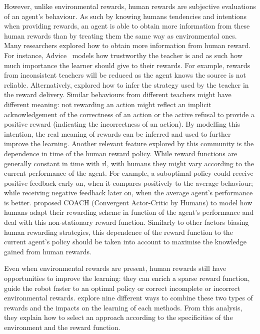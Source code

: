 However, unlike environmental rewards, human rewards are subjective evaluations of an agent's behaviour. As such by knowing humans tendencies and intentions when providing rewards, an agent is able to obtain more information from these human rewards than by treating them the same way as environmental ones. Many researchers explored how to obtain more information from human reward. For instance, Advice~\citep{griffith2013policy} models how trustworthy the teacher is and as such how much importance the learner should give to their rewards. For example, rewards from inconsistent teachers will be reduced as the agent knows the source is not reliable. Alternatively, \cite{loftin2016learning} explored how to infer the strategy used by the teacher in the reward delivery. Similar behaviours from different teachers might have different meaning: not rewarding an action might reflect an implicit acknowledgement of the correctness of an action or the active refusal to provide a positive reward (indicating the incorrectness of an action). By modelling this intention, the real meaning of rewards can be inferred and used to further improve the learning. Another relevant feature explored by this community is the dependence in time of the human reward policy. While reward functions are generally constant in time with \gls{rl}, with humans they might vary according to the current performance of the agent. For example, a suboptimal policy could receive positive feedback early on, when it compares positively to the average behaviour; while receiving negative feedback later on, when the average agent's performance is better. \cite{macglashan2017interactive} proposed COACH (Convergent Actor-Critic by Humans) to model how humans adapt their rewarding scheme in function of the agent's performance and deal with this non-stationary reward function. Similarly to other factors biasing human rewarding strategies, this dependence of the reward function to the current agent's policy should be taken into account to maximise the knowledge gained from human rewards.

Even when environmental rewards are present, human rewards still have opportunities to improve the learning: they can enrich a sparse reward function, guide the robot faster to an optimal policy or correct incomplete or incorrect environmental rewards. \cite{knox2010combining} explore nine different ways to combine these two types of rewards and the impacts on the learning of each methods. From this analysis, they explain how to select an approach according to the specificities of the environment and the reward function.

